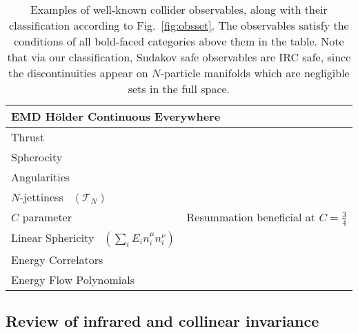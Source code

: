 \documentclass[letterpaper,11pt]{article}
\DeclareRobustCommand{\Fig}[1]{Fig.~\ref{#1}}
\begin{document}
\begin{table}[p]
\begin{flushright}
\begin{tabular}{p{} p{}}
 \multicolumn{2}{l}{\cellcolor{table_teal_bg} \textbf{\textcolor{table_teal}{EMD H\"{o}lder Continuous Everywhere}}} \\
\hline
\cellcolor{table_teal_bg} Thrust~\cite{Brandt:1964sa,Farhi:1977sg} & \cellcolor{table_teal_bg} \\
\cellcolor{table_teal_bg} Spherocity~\cite{Georgi:1977sf} & \cellcolor{table_teal_bg}  \\ 
\cellcolor{table_teal_bg} Angularities~\cite{Berger:2003iw} & \cellcolor{table_teal_bg}  \\ 
\cellcolor{table_teal_bg} $N$-jettiness~\cite{Stewart:2010tn} $\left(\mathcal T_N\right)$ & \cellcolor{table_teal_bg}  \\
\cellcolor{table_teal_bg} $C$ parameter~\cite{Parisi:1978eg,Donoghue:1979vi,Ellis:1980wv,Catani:1997xc} & Resummation beneficial at $C = \frac34$ \cellcolor{table_teal_bg} \\
\cellcolor{table_teal_bg} Linear Sphericity~\cite{Donoghue:1979vi} $\left(\sum_i E_i n_i^\mu n_i^\nu \right)$ & \cellcolor{table_teal_bg}  \\
\cellcolor{table_teal_bg} Energy Correlators~\cite{Banfi:2004yd,Larkoski:2013eya,Larkoski:2014gra,Moult:2016cvt} & \cellcolor{table_teal_bg}  \\
\cellcolor{table_teal_bg} Energy Flow Polynomials~\cite{Komiske:2017aww,Komiske:2019asc} & \cellcolor{table_teal_bg}  \\
%
\hline\hline
%
\end{tabular}
\end{flushright}
\caption{
%
Examples of well-known collider observables, along with their classification according to \Fig{fig:obsset}.
%
The observables satisfy the conditions of all bold-faced categories above them in the table.
%
Note that via our classification, Sudakov safe observables are IRC safe, since the discontinuities appear on $N$-particle manifolds which are negligible sets in the full space.
}
\label{tab:exampleobs}
\end{table}


\subsection{Review of infrared and collinear invariance}
\label{sec:invariance}
\end{document}
